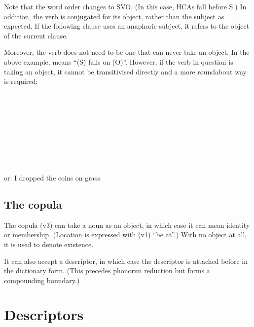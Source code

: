\documentclass{book}
\begin{document}
Note that the word order changes to SVO. (In this case, HCAs fall before S.) In addition, the verb is conjugated for its object, rather than the subject as expected. If the following clause uses an anaphoric subject, it refers to the object of the current clause.

Moreover, the verb does not need to be one that can never take an object. In the above example,  means ``(S) falls on (O)''. However, if the verb in question is taking an object, it cannot be transitivised directly and a more roundabout way is required: \\
~\\
 \\
   \\
   \\
~\\
 \\
 \\
     \\
     \\
or: I dropped the coins on grass.

\section{The copula}

The copula  (v3) can take a noun as an object, in which case it can mean identity or membership. (Location is expressed with  (v1) ``be at''.) With no object at all, it is used to denote existence.

It can also accept a descriptor, in which case the descriptor is attached before  in the dictionary form. (This precedes phonorun reduction but forms a compounding boundary.)

\chapter{Descriptors}
\end{document}
